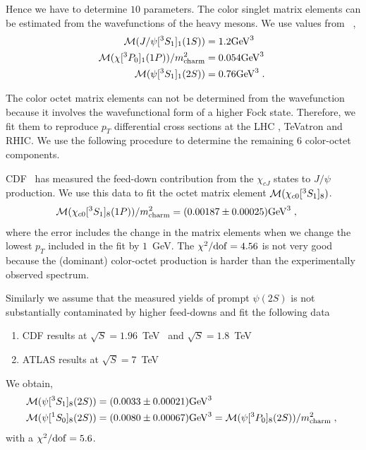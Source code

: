 \documentclass[article,showpacs,preprintnumbers,amsmath,amssymb]{revtex4}
\newcommand{\rGeV}{{\rm GeV}}
\newcommand{\rdof}{{\rm dof}}
\newcommand{\charm}{{\rm{charm}}}
\begin{document}
\begin{appendix}
Hence we have to determine $10$ parameters. The color singlet matrix elements
can be estimated from the wavefunctions of the heavy mesons. We use values from
~\cite{Cho:1995ce,Cho:1995vh,Eichten:1994gt},
\begin{equation}
\begin{split}
{\cal{M}}(J/\psi[^3S_1]_{1}(1S)) &= 1.2 \rGeV^3\\
{\cal{M}}(\chi[^3P_0]_{1}(1P))/m_{\charm}^2 &= 0.054 \rGeV^3\\
{\cal{M}}(\psi[^3S_1]_{1}(2S)) &= 0.76 \rGeV^3\;.
~\label{eq:MCSpsi_val}
\end{split}
\end{equation}

The color octet matrix elements can not be determined from the wavefunction
because it involves the wavefunctional form of a higher Fock state. Therefore,
we fit them to reproduce $p_T$ differential cross sections at the LHC ,
TeVatron and RHIC. We use the following procedure to determine the remaining
$6$ color-octet components. 

CDF~\cite{Abe:1997yz} has measured the feed-down contribution from the
$\chi_{cJ}$ states to $J/\psi$ production. We use this data to fit the octet
matrix element ${\cal{M}}(\chi_{c0}[^3S_1]_{8})$.
\begin{equation}
\begin{split}
{\cal{M}}(\chi_{c0}[^3S_1]_{8}(1P))/m_{\charm}^2 &= (0.00187\pm 0.00025) \rGeV^3\;,
~\label{eq:Mchicn1CO_val}
\end{split}
\end{equation}
where the error includes the change in the matrix elements when we change the
lowest $p_T$ included in the fit by $1$~GeV.  The $\chi^2/\rdof=4.56$ is not
very good because the (dominant) color-octet production is harder than the
experimentally observed spectrum.

Similarly we assume that the measured yields of prompt $\psi(2S)$ is not
substantially contaminated by higher feed-downs and fit the following data
\begin{enumerate}
\item{CDF results at $\sqrt{S}=1.96$~TeV~\cite{Aaltonen:2009dm} and
$\sqrt{S}=1.8$~TeV~\cite{Abe:1997yz,Abe:1997older}}
\item{ATLAS results at $\sqrt{S}=7$~TeV~\cite{Chatrchyan:2011kc}}
\end{enumerate}

We obtain,
\begin{equation}
\begin{split}
{\cal{M}}(\psi[^3S_1]_{8}(2S)) &= (0.0033\pm 0.00021) \rGeV^3\\
{\cal{M}}(\psi[^1S_0]_{8}(2S)) &= (0.0080\pm 0.00067) \rGeV^3=
{\cal{M}}(\psi[^3P_0]_{8}(2S))/m_{\charm}^2\;,
~\label{eq:MJn2CO_val}
\end{split}
\end{equation}
with a $\chi^2/\rdof=5.6$. 


\end{appendix}
\end{document}
